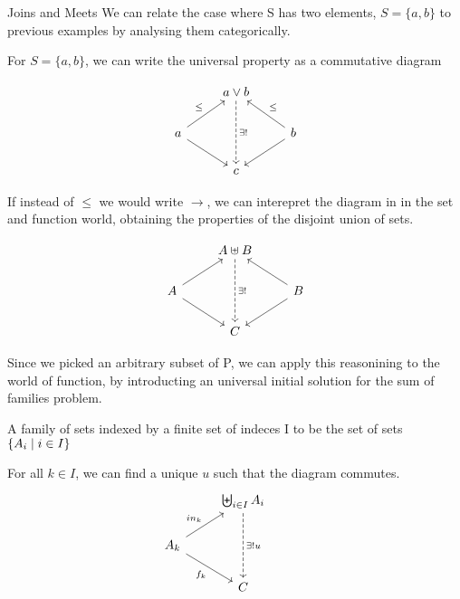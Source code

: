 \begin{section}{Joins and Meets}
        We can relate the case where S has two elements, $S = \{a, b\}$ to previous
        examples by analysing them categorically.
    
        For $S = \{a, b\}$, we can write the universal property as a commutative diagram 
    
        \begin{align*}
            \begin{tikzcd}[ampersand replacement=\&]
                {} \& a \vee b \arrow[dd, dashed, "\exists ! "] \& {} \\
                a \arrow[ru, "\leq"] \arrow[rd, swap]
                \& {}
                \&
                b \arrow[lu, swap, "\leq"] \arrow[ld]
                \\
                {} \& c \& {}
            \end{tikzcd}
        \end{align*}
    
        If instead of $\leq$ we would write $\rightarrow$, we can interepret the diagram in
        in the set and function world, obtaining the properties of the disjoint union of sets.
    
        \begin{align*}
            \begin{tikzcd}[ampersand replacement=\&]
                {} \& A \uplus B \arrow[dd, dashed, "\exists ! "] \& {} \\
                A \arrow[ru] \arrow[rd, swap]
                \& {}
                \&
                B \arrow[lu, swap] \arrow[ld]
                \\
                {} \& C \& {}
            \end{tikzcd}
        \end{align*}
    
        Since we picked an arbitrary subset of P, we can apply this reasonining to
        the world of function, by introducting an universal initial solution for 
        the sum of families problem.
    
        \begin{definition} A family of sets indexed by a finite set of indeces I   
        to be the set of sets $\{ A_i \mid i \in I \}$
        \end{definition}
        For all $k \in I$, we can find a unique $u$ such that the diagram commutes.
        \begin{align*}
            \begin{tikzcd}[ampersand replacement=\&]
                {} \& \biguplus_{i \in I} A_i \arrow[dd, dashed, "\exists ! u"] \& {} \\
                A_k \arrow[ru, "in_k"] \arrow[rd, swap, "f_k"]
                \& {}
                \\
                {} \& C \& {}
            \end{tikzcd}
        \end{align*}
    

\end{section}
